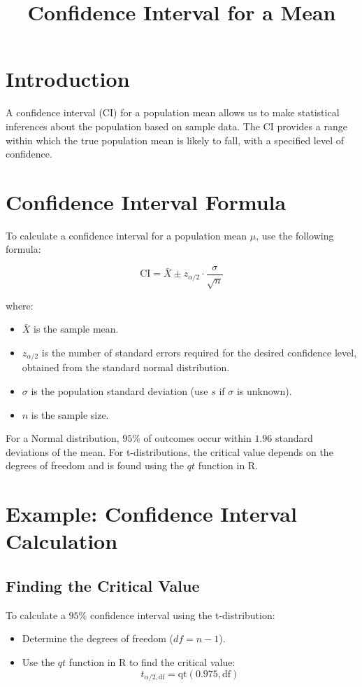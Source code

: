 \documentclass{article}
\begin{document}
\title{Confidence Interval for a Mean}
\author{}
\date{}
\maketitle

\section{Introduction}
A confidence interval (CI) for a population mean allows us to make statistical inferences about the population based on sample data. The CI provides a range within which the true population mean is likely to fall, with a specified level of confidence.

\section{Confidence Interval Formula}
To calculate a confidence interval for a population mean \(\mu\), use the following formula:

\[
\text{CI} = \bar{X} \pm z_{\alpha/2} \cdot \frac{\sigma}{\sqrt{n}}
\]

where:
\begin{itemize}
    \item \(\bar{X}\) is the sample mean.
    \item \(z_{\alpha/2}\) is the number of standard errors required for the desired confidence level, obtained from the standard normal distribution.
    \item \(\sigma\) is the population standard deviation (use \(s\) if \(\sigma\) is unknown).
    \item \(n\) is the sample size.
\end{itemize}

For a Normal distribution, \(95\%\) of outcomes occur within \(1.96\) standard deviations of the mean. For t-distributions, the critical value depends on the degrees of freedom and is found using the \(qt\) function in R.

\section{Example: Confidence Interval Calculation}
\subsection{Finding the Critical Value}
To calculate a \(95\%\) confidence interval using the t-distribution:
\begin{itemize}
    \item Determine the degrees of freedom (\(df = n - 1\)).
    \item Use the \(qt\) function in R to find the critical value:
    \[
    t_{\alpha/2, \text{df}} = \text{qt}(0.975, \text{df})
    \]
\end{itemize}
\end{document}
